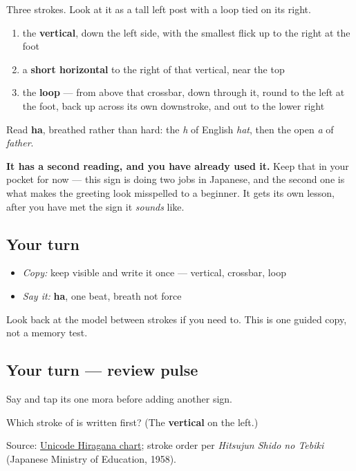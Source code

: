 \begin{quote}
\end{quote}

Three strokes. Look at it as a tall left post with a loop tied on its right.

\begin{enumerate}
\raggedright
  \item the \textbf{vertical}, down the left side, with the smallest flick up to the right at the foot
  \item a \textbf{short horizontal} to the right of that vertical, near the top
  \item the \textbf{loop} — from above that crossbar, down through it, round to the left at the foot, back up across its own downstroke, and out to the lower right
\end{enumerate}

Read \textbf{ha}, breathed rather than hard: the \emph{h} of English \emph{hat}, then the open \emph{a} of \emph{father}.

\textbf{It has a second reading, and you have already used it.} Keep that in your pocket for now — this sign is doing two jobs in Japanese, and the second one is what makes the greeting look misspelled to a beginner. It gets its own lesson, after you have met the sign it \emph{sounds} like.

\subsection*{Your turn}
\begin{itemize}
\raggedright
  \item \emph{Copy:} keep  visible and write it once — vertical, crossbar, loop
  \item \emph{Say it:} \textbf{ha}, one beat, breath not force
\end{itemize}

Look back at the model between strokes if you need to. This is one guided copy, not a memory test.

\subsection*{Your turn — review pulse}
Say \textbf{} and tap its one mora before adding another sign.

\begin{tcolorbox}[breakable,colback=teal!4,colframe=teal!35!black,title={Before you move on}]
Which stroke of  is written first? (The \textbf{vertical} on the left.)

Source: \href{https://www.unicode.org/charts/PDF/U3040.pdf}{Unicode Hiragana chart}; stroke order per \emph{Hitsujun Shido no Tebiki} (Japanese Ministry of Education, 1958).
\end{tcolorbox}
